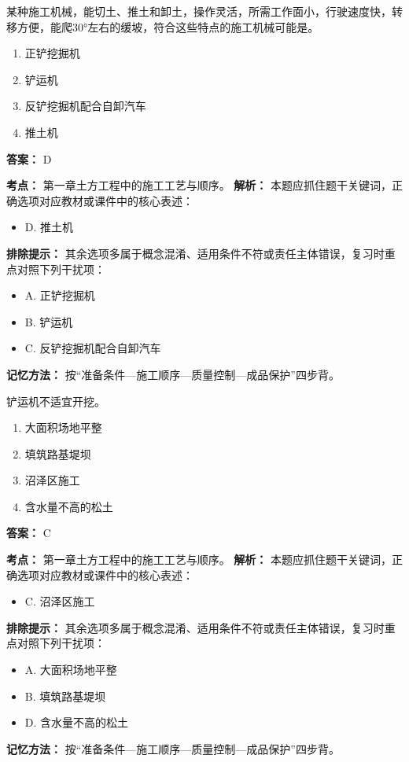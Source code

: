\documentclass[UTF8,fontset=fandol,11pt]{ctexart}
\begin{document}
\begin{quizbox}[title={第 4 题}]
某种施工机械，能切土、推土和卸土，操作灵活，所需工作面小，行驶速度快，转移方便，能爬30°左右的缓坡，符合这些特点的施工机械可能是。\\
\begin{enumerate}[label=\Alph*.]
\item 正铲挖掘机
\item 铲运机
\item 反铲挖掘机配合自卸汽车
\item 推土机
\end{enumerate}
\textbf{答案：} D
\vspace{0.25em}
\begin{answerbox}[title={考点解析}]
\textbf{考点：} 第一章土方工程中的施工工艺与顺序。
\textbf{解析：} 本题应抓住题干关键词，正确选项对应教材或课件中的核心表述：
\begin{itemize}
\item D. 推土机
\end{itemize}
\textbf{排除提示：} 其余选项多属于概念混淆、适用条件不符或责任主体错误，复习时重点对照下列干扰项：
\begin{itemize}
\item A. 正铲挖掘机
\item B. 铲运机
\item C. 反铲挖掘机配合自卸汽车
\end{itemize}
\textbf{记忆方法：} 按“准备条件—施工顺序—质量控制—成品保护”四步背。
\end{answerbox}
\end{quizbox}

\begin{quizbox}[title={第 5 题}]
铲运机不适宜开挖。\\
\begin{enumerate}[label=\Alph*.]
\item 大面积场地平整
\item 填筑路基堤坝
\item 沼泽区施工
\item 含水量不高的松土
\end{enumerate}
\textbf{答案：} C
\vspace{0.25em}
\begin{answerbox}[title={考点解析}]
\textbf{考点：} 第一章土方工程中的施工工艺与顺序。
\textbf{解析：} 本题应抓住题干关键词，正确选项对应教材或课件中的核心表述：
\begin{itemize}
\item C. 沼泽区施工
\end{itemize}
\textbf{排除提示：} 其余选项多属于概念混淆、适用条件不符或责任主体错误，复习时重点对照下列干扰项：
\begin{itemize}
\item A. 大面积场地平整
\item B. 填筑路基堤坝
\item D. 含水量不高的松土
\end{itemize}
\textbf{记忆方法：} 按“准备条件—施工顺序—质量控制—成品保护”四步背。
\end{answerbox}
\end{quizbox}
\end{document}
